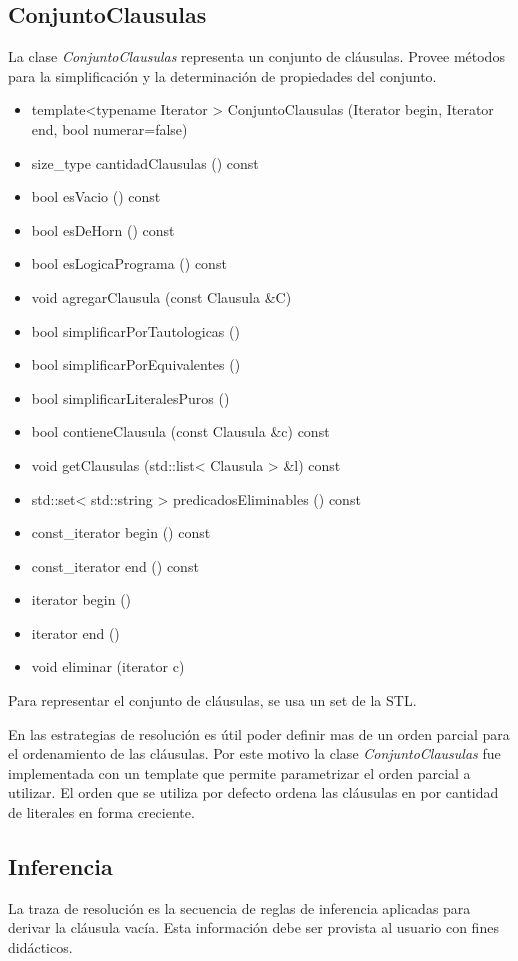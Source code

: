 \documentclass[a4paper,12pt]{article}
\begin{document}
\subsection{ConjuntoClausulas}
La clase \emph{ConjuntoClausulas} representa un conjunto de cláusulas. Provee métodos
para la simplificación y la determinación de propiedades del conjunto.
\begin{itemize}
\renewcommand{\labelitemi}{$\bullet$}
\item template<typename Iterator > ConjuntoClausulas (Iterator begin, Iterator end, bool numerar=false)
\item size\_type cantidadClausulas () const
\item bool esVacio () const
\item bool esDeHorn () const
\item bool esLogicaPrograma () const
\item void agregarClausula (const Clausula \&C)
\item bool simplificarPorTautologicas ()
\item bool simplificarPorEquivalentes ()
\item bool simplificarLiteralesPuros ()
\item bool contieneClausula (const Clausula \&c) const
\item void getClausulas (std::list< Clausula > \&l) const
\item std::set< std::string > predicadosEliminables () const
\item const\_iterator begin () const
\item const\_iterator end () const
\item iterator begin ()
\item iterator end ()
\item void eliminar (iterator c)
\end{itemize}
Para representar el conjunto de cláusulas, se usa un set de la STL.

En las estrategias de resolución es útil poder definir mas de un orden parcial para el ordenamiento de
las cláusulas. Por este motivo la clase \emph{ConjuntoClausulas} fue implementada con un template que
permite parametrizar el orden parcial a utilizar. El orden que se utiliza por defecto ordena las cláusulas
en por cantidad de literales en forma creciente.
\subsection{Inferencia}
La traza de resolución es la secuencia de reglas de inferencia aplicadas para derivar la cláusula
vacía. Esta información debe ser provista al usuario con fines didácticos. 
\end{document}
